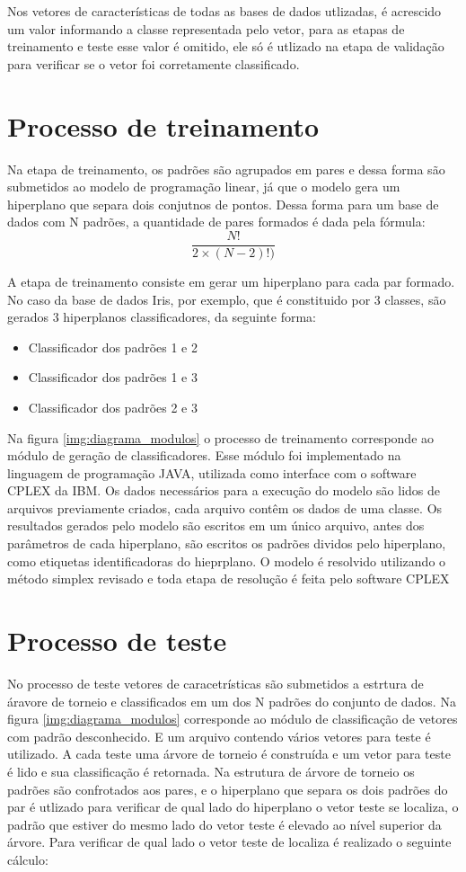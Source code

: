 Nos vetores de características de todas as bases de dados utlizadas, é acrescido um valor informando a classe representada pelo vetor, para as etapas de treinamento e teste esse valor é omitido, ele só é utlizado na etapa de validação para verificar se o vetor foi corretamente classificado.

\section{Processo de treinamento}
Na etapa de treinamento, os padrões são agrupados em pares e dessa forma são submetidos ao modelo de programação linear, já que o modelo gera um hiperplano que separa dois conjutnos de pontos. Dessa forma para um base de dados com N padrões, a quantidade de pares formados é dada pela fórmula:
$$ \frac{N!}{2\times (N-2)!)} $$

A etapa de treinamento consiste em gerar um hiperplano para cada par formado. No caso da base de dados Iris, por exemplo, que é constituido por 3 classes, são gerados 3 hiperplanos classificadores, da seguinte forma: 
\begin{itemize}
\item{Classificador dos padrões 1 e 2}
\item{Classificador dos padrões 1 e 3}
\item{Classificador dos padrões 2 e 3}
\end{itemize}

Na figura \ref{img:diagrama_modulos} o processo de treinamento corresponde ao módulo de geração de classificadores. Esse módulo foi implementado na linguagem de programação JAVA, utilizada como interface com o software CPLEX da IBM. Os dados necessários para a execução do modelo são lidos de arquivos previamente criados, cada arquivo contêm os dados de uma classe. Os resultados gerados pelo modelo são escritos em um único arquivo, antes dos parâmetros de cada hiperplano, são escritos os padrões dividos pelo hiperplano, como etiquetas identificadoras do hieprplano.
O modelo é resolvido utilizando o método simplex revisado e toda etapa de resolução é feita pelo software CPLEX

\section{Processo de teste}
No processo de teste vetores de caracetrísticas são submetidos a estrtura de áravore de torneio e classificados em um dos N padrões do conjunto de dados.
Na figura \ref{img:diagrama_modulos} corresponde ao módulo de classificação de vetores com padrão desconhecido. E um arquivo contendo vários vetores para teste é utilizado.  A cada teste uma árvore de torneio é construída e um vetor para teste é lido e sua classificação é retornada. Na estrutura de árvore de torneio os padrões são confrotados aos pares, e o hiperplano que separa os dois padrões do par é utlizado para verificar de qual lado do hiperplano o vetor teste se localiza, o padrão que estiver do mesmo lado do vetor teste é elevado ao nível superior da árvore. Para verificar de qual lado o vetor teste de localiza é realizado o seguinte cálculo:

